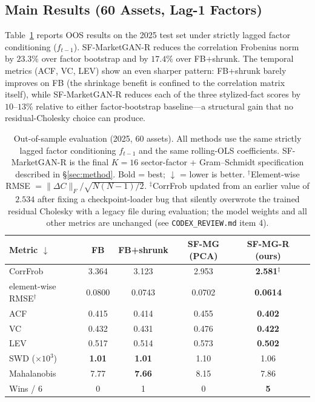 \subsection{Main Results (60 Assets, Lag-1 Factors)}

Table~\ref{tab:main} reports OOS results on the 2025 test set under strictly lagged factor conditioning ($f_{t-1}$). SF-MarketGAN-R reduces the correlation Frobenius norm by $23.3\%$ over factor bootstrap and by $17.4\%$ over FB+shrunk. The temporal metrics (ACF, VC, LEV) show an even sharper pattern: FB+shrunk barely improves on FB (the shrinkage benefit is confined to the correlation matrix itself), while SF-MarketGAN-R reduces each of the three stylized-fact scores by $10$--$13\%$ relative to either factor-bootstrap baseline---a structural gain that no residual-Cholesky choice can produce.

\begin{table}[h]
\centering
\caption{Out-of-sample evaluation (2025, 60 assets). All methods use the same strictly lagged factor conditioning $f_{t-1}$ and the same rolling-OLS coefficients. SF-MarketGAN-R is the final $K=16$ sector-factor + Gram--Schmidt specification described in \S\ref{sec:method}. Bold = best; $\downarrow$ = lower is better. $^\dagger$Element-wise RMSE $= \|\Delta C\|_F / \sqrt{N(N-1)/2}$. $^\ddagger$CorrFrob updated from an earlier value of $2.534$ after fixing a checkpoint-loader bug that silently overwrote the trained residual Cholesky with a legacy file during evaluation; the model weights and all other metrics are unchanged (see \texttt{CODEX\_REVIEW.md} item 4).}
\label{tab:main}
\small
\begin{tabular}{lccccc}
\toprule
Metric $\downarrow$ & FB & FB+shrunk & SF-MG (PCA) & \textbf{SF-MG-R (ours)} \\
\midrule
CorrFrob & 3.364 & 3.123 & 2.953 & \textbf{2.581$^\ddagger$} \\
\;\;element-wise RMSE$^\dagger$ & 0.0800 & 0.0743 & 0.0702 & \textbf{0.0614} \\
ACF & 0.415 & 0.414 & 0.455 & \textbf{0.402} \\
VC & 0.432 & 0.431 & 0.476 & \textbf{0.422} \\
LEV & 0.517 & 0.514 & 0.573 & \textbf{0.502} \\
SWD ($\times 10^3$) & \textbf{1.01} & \textbf{1.01} & 1.10 & 1.06 \\
Mahalanobis & 7.77 & \textbf{7.66} & 8.15 & 7.86 \\
\midrule
Wins / 6 & 0 & 1 & 0 & \textbf{5} \\
\bottomrule
\end{tabular}
\end{table}

